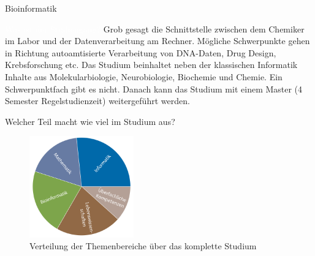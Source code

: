 	\begin{Huge}
				Bioinformatik
			\end{Huge}
			\begin{exampleblock}{\textcolor{white}{Was ist der Studiengang?}}
				Grob gesagt die Schnittstelle zwischen dem Chemiker im Labor und der Datenverarbeitung am Rechner. Mögliche Schwerpunkte gehen in Richtung autoamtisierte Verarbeitung von DNA-Daten, Drug Design, Krebsforschung etc.
				Das Studium beinhaltet neben der klassischen Informatik Inhalte aus Molekularbiologie, Neurobiologie, Biochemie und Chemie. Ein Schwerpunktfach gibt es nicht. Danach kann das Studium mit einem Master (4 Semester Regelstudienzeit) weitergeführt werden.
			\end{exampleblock}
		
			\begin{block}{Welcher Teil macht wie viel im Studium aus?}
				\begin{figure}[h!]
						\includegraphics[width=0.4\textwidth]{charts/bioinformatik-Piechart.pdf}
					\caption{Verteilung der Themenbereiche über das komplette Studium}
				\end{figure}
			\end{block}
		
